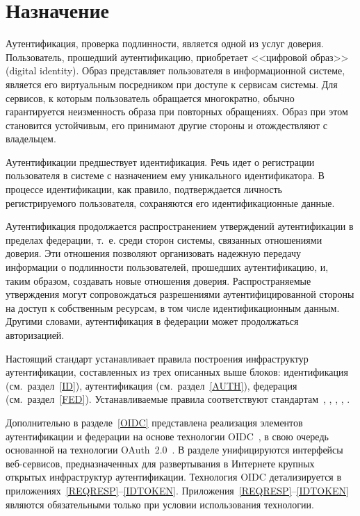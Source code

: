 \section{Назначение}\label{COMMON.Purpose}

Аутентификация, проверка подлинности, является одной из услуг доверия. 
%
Пользователь, прошедший аутентификацию, приобретает <<цифровой образ>> 
(digital identity). Образ представляет пользователя в информационной системе, 
является его виртуальным посредником при доступе к сервисам системы.
%
Для сервисов, к которым пользователь обращается многократно, обычно 
гарантируется неизменность образа при повторных обращениях. 
%
Образ при этом становится устойчивым, его принимают другие стороны 
и отождествляют с владельцем.

Аутентификации предшествует идентификация. Речь идет о регистрации пользователя
в системе с назначением ему уникального идентификатора. В процессе
идентификации, как правило, подтверждается личность регистрируемого
пользователя, сохраняются его идентификационные данные.

Аутентификация продолжается распространением утверждений аутентификации в
пределах федерации, т.~е. среди сторон системы, связанных отношениями 
доверия.
%
Эти отношения позволяют организовать надежную передачу информации о подлинности 
пользователей, прошедших аутентификацию, и, таким образом, создавать новые отношения 
доверия.
%
Распространяемые утверждения могут сопровождаться разрешениями
аутентифицированной стороны на доступ к собственным ресурсам, в том числе
идентификационным данным. Другими словами, аутентификация в федерации может
продолжаться авторизацией.


Настоящий стандарт устанавливает правила построения инфраструктур 
аутентификации, составленных из трех описанных выше блоков: 
идентификация (см.~раздел~\ref{ID}), аутентификация (см.~раздел~\ref{AUTH}), 
федерация (см.~раздел~\ref{FED}).
%           
Устанавливаемые правила соответствуют 
стандартам~\cite{ISO29115}, \cite{SP800-63-3}, \cite{SP800-63-3A},
\cite{SP800-63-3B}, \cite{SP800-63-3C}. 

Дополнительно в разделе~\ref{OIDC} представлена реализация элементов 
аутентификации и федерации на основе технологии OIDC~\cite{OIDC}, в свою 
очередь основанной на технологии OAuth~2.0~\cite{RFC6749}. В разделе 
унифицируются интерфейсы веб-сервисов, предназначенных для развертывания
в Интернете крупных открытых инфраструктур аутентификации.
%
Технология OIDC детализируется в приложениях~\ref{REQRESP}--\ref{IDTOKEN}. 
%
Приложения~\ref{REQRESP}--\ref{IDTOKEN} являются обязательными только при 
условии использования технологии.

